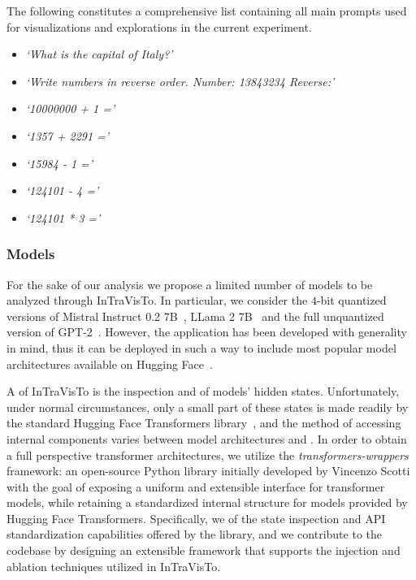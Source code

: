 The following constitutes a comprehensive list containing all main prompts used for visualizations and explorations in the current experiment.

\begin{multicols}{2}
    \begin{itemize}
        \item \emph{`What is the capital of Italy?'}
        \item \emph{`Write numbers in reverse order. Number: 13843234 Reverse:'}
        \item \emph{`10000000 + 1 ='}
        \item \emph{`1357 + 2291 ='}
        \item \emph{`15984 - 1 ='}
        \item \emph{`124101 - 4 ='}
        \item \emph{`124101 * 3 ='}
    \end{itemize}
\end{multicols}

\subsubsection{Models}

For the sake of our analysis we propose a limited number of models to be analyzed through InTraVisTo.
In particular, we consider the $4$-bit quantized versions of Mistral Instruct 0.2 7B~\cite{jiang2023}, LLama 2 7B~\cite{touvron2023} and the full unquantized version of GPT-2~\cite{radford2019}.
However, the application has been developed with generality in mind, thus it can be deployed in such a way to include most popular model architectures available on Hugging Face~\cite{wolf2020}.

A  of InTraVisTo is the inspection and  of models' hidden states.
Unfortunately, under normal circumstances, only a small part of these states is made readily  by the standard Hugging Face Transformers library~\cite{}, and the method of accessing internal components varies between model architectures and .
In order to obtain a full perspective  transformer architectures, we utilize the \emph{transformers-wrappers} framework\footnotemark: an open-source Python library initially developed by Vincenzo Scotti with the goal of exposing a uniform and extensible interface for transformer models, while retaining a standardized internal structure for models provided by Hugging Face Transformers.
Specifically, we  of the state inspection and API standardization capabilities offered by the library, and we contribute to the codebase by designing an extensible framework that supports the injection and ablation techniques utilized in InTraVisTo.

